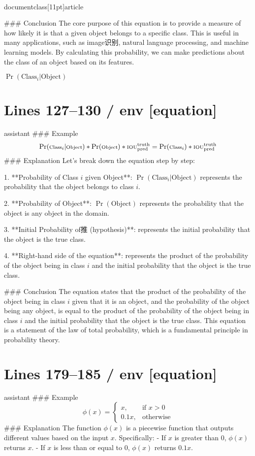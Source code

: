\\documentclass[11pt]{article}
\begin{document}
### Conclusion
The core purpose of this equation is to provide a measure of how likely it is that a given object belongs to a specific class. This is useful in many applications, such as image识别, natural language processing, and machine learning models. By calculating this probability, we can make predictions about the class of an object based on its features.

\(\boxed{\Pr(\textrm{Class}_i | \textrm{Object})}\)


\section*{Lines 127–130 / env [equation]}
assistant
### Example
$$
\scriptsize
\Pr(\textrm{Class}_i | \textrm{Object}) * \Pr(\textrm{Object}) * \textrm{IOU}_{\textrm{pred}}^{\textrm{truth}} = \Pr(\textrm{Class}_i)*\textrm{IOU}_{\textrm{pred}}^{\textrm{truth}}
$$
### Explanation
Let's break down the equation step by step:

1. **Probability of Class \(i\) given Object**: \(\Pr(\textrm{Class}_i | \textrm{Object})\) represents the probability that the object belongs to class \(i\).

2. **Probability of Object**: \(\Pr(\textrm{Object})\) represents the probability that the object is any object in the domain.

3. **Initial Probability of推 (hypothesis)**:  represents the initial probability that the object is the true class.

4. **Right-hand side of the equation**:  represents the product of the probability of the object being in class \(i\) and the initial probability that the object is the true class.

### Conclusion
The equation states that the product of the probability of the object being in class \(i\) given that it is an object, and the probability of the object being any object, is equal to the product of the probability of the object being in class \(i\) and the initial probability that the object is the true class. This equation is a statement of the law of total probability, which is a fundamental principle in probability theory.


\section*{Lines 179–185 / env [equation]}
assistant
### Example
$$
\phi(x) =
\begin{cases}
    x, & \text{if } x > 0\\
    0.1x, & \text{otherwise}
    \end{cases}
$$
### Explanation
The function \(\phi(x)\) is a piecewise function that outputs different values based on the input \(x\). Specifically:
- If \(x\) is greater than 0, \(\phi(x)\) returns \(x\).
- If \(x\) is less than or equal to 0, \(\phi(x)\) returns \(0.1x\).
\end{document}
